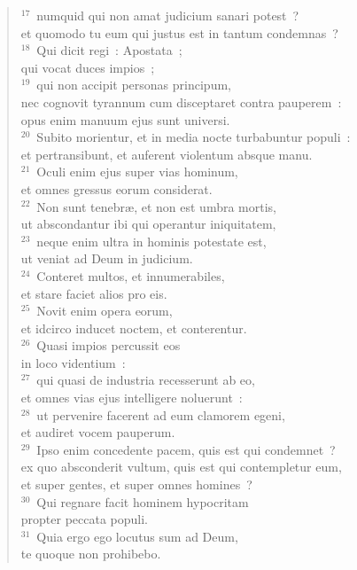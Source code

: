 \begin{flushleft}
\begin{verse}
${}^{17}$~numquid qui non amat judicium sanari potest~?\\ et quomodo tu eum qui justus est in tantum condemnas~?\\
${}^{18}$~Qui dicit regi~: Apostata~;\\ qui vocat duces impios~;\\
${}^{19}$~qui non accipit personas principum,\\ nec cognovit tyrannum cum disceptaret contra pauperem~:\\ opus enim manuum ejus sunt universi.\\
${}^{20}$~Subito morientur, et in media nocte turbabuntur populi~:\\ et pertransibunt, et auferent violentum absque manu.\\
${}^{21}$~Oculi enim ejus super vias hominum,\\ et omnes gressus eorum considerat.\\
${}^{22}$~Non sunt tenebr\ae , et non est umbra mortis,\\ ut abscondantur ibi qui operantur iniquitatem,\\
${}^{23}$~neque enim ultra in hominis potestate est,\\ ut veniat ad Deum in judicium.\\
${}^{24}$~Conteret multos, et innumerabiles,\\ et stare faciet alios pro eis.\\
${}^{25}$~Novit enim opera eorum,\\ et idcirco inducet noctem, et conterentur.\\
${}^{26}$~Quasi impios percussit eos\\ in loco videntium~:\\
${}^{27}$~qui quasi de industria recesserunt ab eo,\\ et omnes vias ejus intelligere noluerunt~:\\
${}^{28}$~ut pervenire facerent ad eum clamorem egeni,\\ et audiret vocem pauperum.\\
${}^{29}$~Ipso enim concedente pacem, quis est qui condemnet~?\\ ex quo absconderit vultum, quis est qui contempletur eum,\\ et super gentes, et super omnes homines~?\\
${}^{30}$~Qui regnare facit hominem hypocritam\\ propter peccata populi.\\
${}^{31}$~Quia ergo ego locutus sum ad Deum,\\ te quoque non prohibebo.\\

\end{verse}
\end{flushleft}

